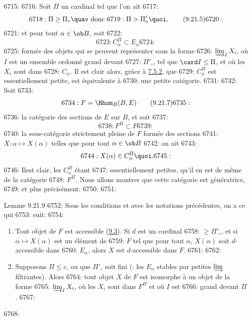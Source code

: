6715: 
6716: Soit $\Pi$ un cardinal tel que l'on ait
6717: \begin{equation}
6718: \Pi\geq \Pi_\circ\quav\mbox{ donc }
6719: \Pi>\Pi'_\circ{\quoi},\tag{9.21.5}
6720: \end{equation}
6721: et pour tout $\alpha\in \ob B$, soit
6722: \begin{equation}
6723: C^{\Pi}_{\alpha}\subset E_{\alpha}\tag{9.21.6}
6724: \end{equation}
6725: formée des objets qui se peuvent représenter sous la forme
6726: $\varinjlim_I X_i$, où $I$ est un ensemble ordonné grand devant
6727: $\Pi'_\circ$, tel que $\card I\leq \Pi$, et où les $X_i$ sont dans
6728: $C_{\alpha}$. Il est clair alors, grâce à \hyperref[I.var7.5.2]{7.5.2}, que
6729: $C^{\Pi}_{\alpha}$ est essentiellement petite, \ie est équivalente à
6730: une petite catégorie.
6731: 
6732: Soit
6733: \begin{equation}
6734: F=\Hhom_B(B,E)\tag{9.21.7}
6735: \end{equation}
6736: la catégorie des sections de $E$ sur $B$, et soit
6737: \begin{equation}
6738: F^{\Pi}\subset F\tag{9.21.8}
6739: \end{equation}
6740: la sous-catégorie strictement pleine de $F$ formée des sections
6741: $X:\alpha\mapsto X(\alpha)$ telles que pour tout $\alpha\in \ob B$
6742: on ait
6743: $$
6744: X(\alpha)\in C^{\Pi}_{\alpha}{\quoi}.
6745: $$
6746: Il\pageoriginale est clair, les $C^{\Pi}_{\alpha}$ étant
6747: essentiellement petites, qu'il en est de même de la catégorie
6748: $F^{\Pi}$. Nous allons montrer que cette catégorie est génératrice,
6749: et plus précisément:
6750: 
6751: \begin{enonce*}{Lemme 9.21.9}
6752: Sous les conditions et avec les notations précédentes, on a ce qui
6753: suit:
6754: \begin{enumerate}
6755: \renewcommand{\theenumi}{\roman{enumi}}
6756: \renewcommand{\labelenumi}{(\theenumi)}
6757: \item Tout objet de $F$ est accessible (\hyperref[I.def9.3]{9.3}). Si $d$ est un cardinal
6758: $\geq \Pi'_\circ$, et si $\alpha\mapsto X(\alpha)$ est un élément de
6759: $F$ tel que pour tout $\alpha$, $X(\alpha)$ soit $d$-accessible dans
6760: $E_{\alpha}$, alors $X$ est $d$-accessible dans $F$.
6761: 
6762: \item Supposons $\Pi\leq c$, ou que $\Pi'_\circ$ soit fini (: les $E_{\alpha}$ stables par petites $\varinjlim$ filtrantes). Alors
6764: tout objet $X$ de $F$ est isomorphe à un objet de la forme
6765: $\varinjlim_I X_i$, où les $X_i$ sont dans $F^{\Pi}$ et où $I$ est
6766: grand devant $\Pi$.
6767: \end{enumerate}
6768: \end{enonce*}
